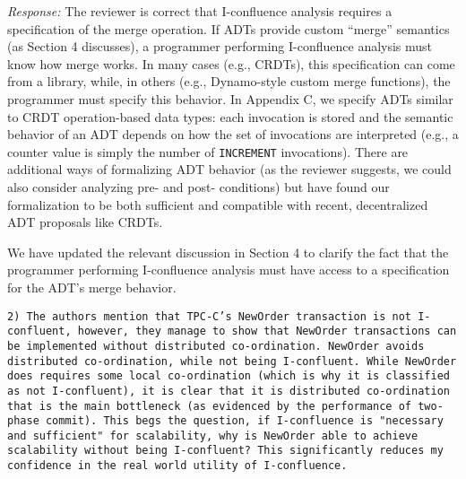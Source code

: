\documentclass[10pt]{article}
\newcommand{\reviewer}[1] {\noindent\colorbox{reviewercolor}{\parbox{\textwidth}{\noindent\texttt{#1}}}\\}
\newcommand{\response}[1] {\noindent\textit{Response: } #1\\}
\begin{document}
\response{The reviewer is correct that I-confluence analysis requires
  a specification of the merge operation. If ADTs provide custom
  ``merge'' semantics (as Section 4 discusses), a programmer
  performing I-confluence analysis must know how merge works. In many
  cases (e.g., CRDTs), this specification can come from a library,
  while, in others (e.g., Dynamo-style custom merge functions), the
  programmer must specify this behavior.  In Appendix C, we specify
ADTs similar to CRDT operation-based data types: each invocation is
stored and the semantic behavior of an ADT depends on how the set of
invocations are interpreted (e.g., a counter value is simply the
number of \texttt{INCREMENT} invocations). There are additional ways
of formalizing ADT behavior (as the reviewer suggests, we could also
consider analyzing pre- and post- conditions) but have found our formalization
to be both sufficient and compatible with recent, decentralized ADT
proposals like CRDTs.
  
  We have updated the relevant discussion in Section 4 to clarify the fact that
  the programmer performing I-confluence analysis must have access to
  a specification for the ADT's merge behavior.}

\reviewer{2) The authors mention that TPC-C's NewOrder transaction is not I-confluent, however, they manage to show that NewOrder transactions can be implemented without distributed co-ordination. NewOrder avoids distributed co-ordination, while not being I-confluent. While NewOrder does requires some local co-ordination (which is why it is classified as not I-confluent), it is clear that it is distributed co-ordination that is the main bottleneck (as evidenced by the performance of two-phase commit). This begs the question, if I-confluence is "necessary and sufficient" for scalability, why is NewOrder able to achieve scalability without being I-confluent? This significantly reduces my confidence in the real world utility of I-confluence. }
\end{document}
